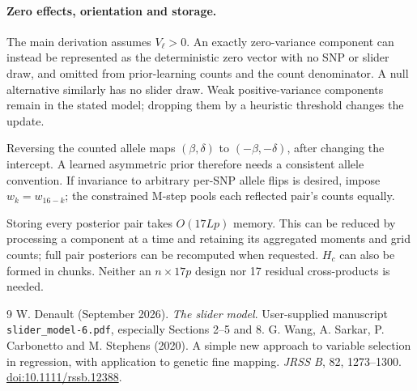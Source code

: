 \documentclass[11pt]{article}
\begin{document}
\paragraph{Zero effects, orientation and storage.}
The main derivation assumes $V_\ell>0$. An exactly zero-variance
component can instead be represented as the deterministic zero vector
with no SNP or slider draw, and omitted from prior-learning counts and
the count denominator. A null alternative similarly has no slider
draw. Weak positive-variance components remain in the stated model;
dropping them by a heuristic threshold changes the update.

Reversing the counted allele maps $(\beta,\delta)$ to
$(-\beta,-\delta)$, after changing the intercept. A learned asymmetric
prior therefore needs a consistent allele convention. If invariance
to arbitrary per-SNP allele flips is desired, impose $w_k=w_{16-k}$;
the constrained M-step pools each reflected pair's counts equally.

Storing every posterior pair takes $O(17Lp)$ memory. This can be
reduced by processing a component at a time and retaining its
aggregated moments and grid counts; full pair posteriors can be
recomputed when requested. $H_c$ can also be formed in chunks.
Neither an $n\times17p$ design nor 17 residual cross-products is needed.

\begin{thebibliography}{9}
 W. Denault (September 2026).
\emph{The slider model}. User-supplied manuscript
\texttt{slider\_model-6.pdf}, especially Sections 2--5 and 8.
 G. Wang, A. Sarkar, P. Carbonetto and M. Stephens (2020).
A simple new approach to variable selection in regression, with
application to genetic fine mapping. \emph{JRSS B}, 82, 1273--1300.
\href{https://doi.org/10.1111/rssb.12388}{doi:10.1111/rssb.12388}.
\end{thebibliography}
\end{document}
